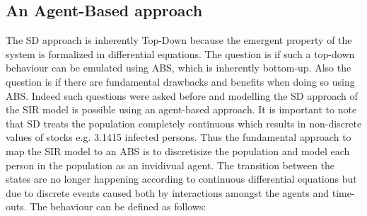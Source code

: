 \subsection{An Agent-Based approach}
The SD approach is inherently Top-Down because the emergent property of the system is formalized in differential equations. The question is if such a top-down behaviour can be emulated using ABS, which is inherently bottom-up. Also the question is if there are fundamental drawbacks and benefits when doing so using ABS. Indeed such questions were asked before and modelling the SD approach of the SIR model is possible using an agent-based approach. It is important to note that SD treats the population completely continuous which results in non-discrete values of stocks e.g. 3.1415 infected persons. Thus the fundamental approach to map the SIR model to an ABS is to discretisize the population and model each person in the population as an invidivual agent. The transition  between the states are no longer happening according to continuous differential equations but due to discrete events caused both by interactions amongst the agents and time-outs. The behaviour can be defined as follows:

